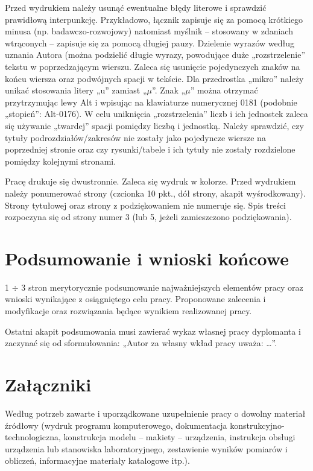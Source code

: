 \documentclass[12pt,twoside]{article}
\begin{document}
Przed wydrukiem należy usunąć ewentualne błędy literowe i sprawdzić prawidłową
interpunkcję. Przykładowo, łącznik zapisuje się za pomocą krótkiego minusa (np.
badawczo-rozwojowy) natomiast myślnik -- stosowany w zdaniach wtrąconych -- zapisuje
się za pomocą długiej pauzy. Dzielenie wyrazów według uznania Autora (można podzielić
długie wyrazy, powodujące duże „rozstrzelenie” tekstu w poprzedzającym wierszu. Zaleca się usunięcie pojedynczych znaków na końcu wiersza oraz podwójnych spacji w tekście.
Dla przedrostka „mikro” należy unikać stosowania litery „u” zamiast „$\mu$”. Znak „$\mu$” można
otrzymać przytrzymując lewy Alt i wpisując na klawiaturze numerycznej 0181 (podobnie
„stopień”: Alt-0176). W celu uniknięcia „rozstrzelenia” liczb i ich jednostek zaleca się
używanie „twardej” spacji pomiędzy liczbą i jednostką. Należy sprawdzić, czy tytuły
podrozdziałów/zakresów nie zostały jako pojedyncze wiersze na poprzedniej stronie oraz
czy rysunki/tabele i ich tytuły nie zostały rozdzielone pomiędzy kolejnymi stronami.

Pracę drukuje się dwustronnie. Zaleca się wydruk w kolorze. Przed wydrukiem
należy ponumerować strony (czcionka 10 pkt., dół strony, akapit wyśrodkowany). Strony
tytułowej oraz strony z podziękowaniem nie numeruje się. Spis treści rozpoczyna się od
strony numer 3 (lub 5, jeżeli zamieszczono podziękowania).

\clearpage

\section{Podsumowanie i wnioski końcowe}

1 $\div$ 3 stron merytorycznie podsumowanie najważniejszych elementów pracy oraz wnioski wynikające z osiągniętego celu pracy. Proponowane zalecenia i modyfikacje oraz rozwiązania będące wynikiem realizowanej pracy.

Ostatni akapit podsumowania musi zawierać wykaz własnej pracy dyplomanta i zaczynać się od sformułowania: „Autor za własny wkład pracy uważa: \ldots”.

\clearpage

\section*{Załączniki}

Według potrzeb zawarte i uporządkowane uzupełnienie pracy o dowolny materiał źródłowy (wydruk programu komputerowego, dokumentacja kons\-truk\-cyj\-no-\-tech\-no\-lo\-gicz\-na, konstrukcja modelu -- makiety -- urządzenia, instrukcja obsługi urządzenia lub stanowiska laboratoryjnego, zestawienie wyników pomiarów i obliczeń, informacyjne materiały katalogowe itp.).
\end{document}

